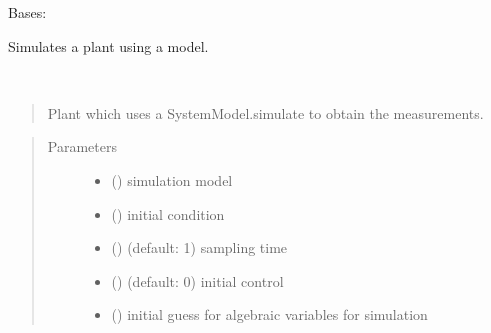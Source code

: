 \documentclass[letterpaper,10pt,english]{sphinxmanual}
\begin{document}
\begin{fulllineitems}
\label{\detokenize{yaocptool.mpc:yaocptool.mpc.plant.PlantSimulation}}
Bases: {\hyperref[\detokenize{yaocptool.mpc:yaocptool.mpc.plant.Plant}]{}}

Simulates a plant using a model.

\begin{fulllineitems}
\label{\detokenize{yaocptool.mpc:yaocptool.mpc.plant.PlantSimulation.__init__}}~\begin{quote}

Plant which uses a SystemModel.simulate to obtain the measurements.
\end{quote}
\begin{quote}\begin{description}
\item[{Parameters}] \leavevmode\begin{itemize}
\item {} 
 ({\hyperref[\detokenize{yaocptool.modelling:yaocptool.modelling.system_model.SystemModel}]{}}) \textendash{} simulation model

\item {} 
 () \textendash{} initial condition

\item {} 
 () \textendash{} (default: 1) sampling time

\item {} 
 () \textendash{} (default: 0) initial control

\item {} 
 () \textendash{} initial guess for algebraic variables for simulation


\end{itemize}
\end{description}
\end{quote}
\end{fulllineitems}
\end{fulllineitems}
\end{document}
